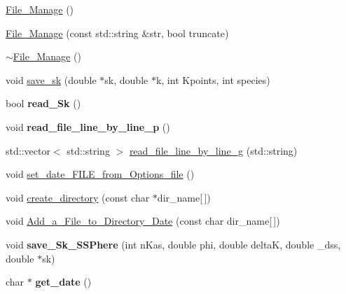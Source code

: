 \begin{DoxyCompactItemize}
\item 
\hyperlink{class_file___manage_abc8dc9e06400e1b1e67a8d9dddef4393}{File\+\_\+\+Manage} ()
\item 
\hyperlink{class_file___manage_a0315b0bb47c3572e17978b367aef66b9}{File\+\_\+\+Manage} (const std\+::string \&str, bool truncate)
\item 
\hyperlink{class_file___manage_a304e6be6ea118b79bf9aa2bf6fad5523}{$\sim$\+File\+\_\+\+Manage} ()
\item 
void \hyperlink{class_file___manage_a994b1789f2e06c194cd9e50c708197cd}{save\+\_\+sk} (double $\ast$sk, double $\ast$k, int Kpoints, int species)
\item 
bool {\bfseries read\+\_\+\+Sk} ()\hypertarget{class_file___manage_a1e38c35a55c0ed0d5323a93e8aa2ef97}{}\label{class_file___manage_a1e38c35a55c0ed0d5323a93e8aa2ef97}

\item 
void {\bfseries read\+\_\+file\+\_\+line\+\_\+by\+\_\+line\+\_\+p} ()\hypertarget{class_file___manage_a92234a6c1b0ee752da82a10dc8c1f67c}{}\label{class_file___manage_a92234a6c1b0ee752da82a10dc8c1f67c}

\item 
std\+::vector$<$ std\+::string $>$ \hyperlink{class_file___manage_aa433eb719c0e2aca12ccf7318c88fd18}{read\+\_\+file\+\_\+line\+\_\+by\+\_\+line\+\_\+g} (std\+::string)
\item 
void \hyperlink{class_file___manage_a4fad3d9f394f5fd1f6d8a3accec9c4d1}{set\+\_\+date\+\_\+\+F\+I\+L\+E\+\_\+from\+\_\+\+Options\+\_\+file} ()
\item 
void \hyperlink{class_file___manage_a43a37464905930b06edbf0c4f54f7535}{create\+\_\+directory} (const char $\ast$dir\+\_\+name\mbox{[}$\,$\mbox{]})
\item 
void \hyperlink{class_file___manage_a3b93465cf17542be8ad7003f8924e12b}{Add\+\_\+a\+\_\+\+File\+\_\+to\+\_\+\+Directory\+\_\+\+Date} (const char dir\+\_\+name\mbox{[}$\,$\mbox{]})
\item 
void {\bfseries save\+\_\+\+Sk\+\_\+\+S\+S\+Phere} (int n\+Kas, double phi, double deltaK, double \+\_\+dss, double $\ast$sk)\hypertarget{class_file___manage_a37663503715d54409a9b7bf661971720}{}\label{class_file___manage_a37663503715d54409a9b7bf661971720}

\item 
char $\ast$ {\bfseries get\+\_\+date} ()\hypertarget{class_file___manage_a369015860dcc9bc16e5445f967e44d9d}{}\label{class_file___manage_a369015860dcc9bc16e5445f967e44d9d}


\end{DoxyCompactItemize}
